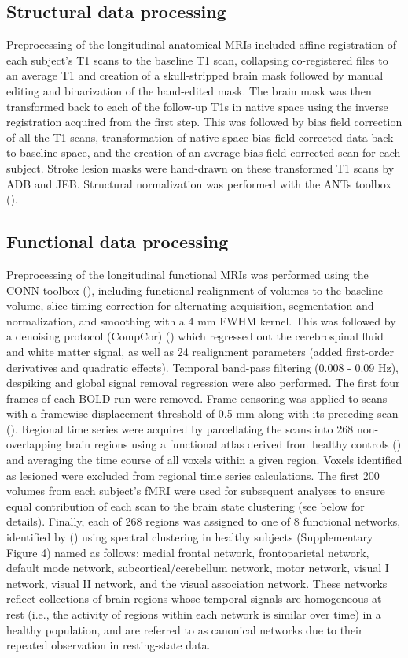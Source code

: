 \documentclass[phd,tocprelim]{cornell}
\begin{document}
	\subsection{Structural data processing}
	Preprocessing of the longitudinal anatomical MRIs included affine registration of each subject’s T1 scans to the baseline T1 scan, collapsing co-registered files to an average T1 and creation of a skull-stripped brain mask followed by manual editing and binarization of the hand-edited mask. The brain mask was then transformed back to each of the follow-up T1s in native space using the inverse registration acquired from the first step. This was followed by bias field correction of all the T1 scans, transformation of native-space bias field-corrected data back to baseline space, and the creation of an average bias field-corrected scan for each subject. Stroke lesion masks were hand-drawn on these transformed T1 scans by ADB and JEB. Structural normalization was performed with the ANTs toolbox (\cite{Avants2011-bl}).
	
	\subsection{Functional data processing}
	Preprocessing of the longitudinal functional MRIs was performed using the CONN toolbox (\cite{Whitfield-Gabrieli2012-ox}), including functional realignment of volumes to the baseline volume, slice timing correction for alternating acquisition, segmentation and normalization, and smoothing with a 4 mm FWHM kernel. This was followed by a denoising protocol (CompCor) (\cite{Behzadi2007-zt}) which regressed out the cerebrospinal fluid and white matter signal, as well as 24 realignment parameters (added first-order derivatives and quadratic effects). Temporal band-pass filtering (0.008 - 0.09 Hz), despiking and global signal removal regression were also performed. The first four frames of each BOLD run were removed. Frame censoring was applied to scans with a framewise displacement threshold of 0.5 mm along with its preceding scan (\cite{Power2012-zm}). Regional time series were acquired by parcellating the scans into 268 non-overlapping brain regions using a functional atlas derived from healthy controls (\cite{Shen2013-zn}) and averaging the time course of all voxels within a given region. Voxels identified as lesioned were excluded from regional time series calculations. The first 200 volumes from each subject's fMRI were used for subsequent analyses to ensure equal contribution of each scan to the brain state clustering (see below for details). Finally, each of 268 regions was assigned to one of 8 functional networks, identified by (\cite{Finn2015-er}) using spectral clustering in healthy subjects (Supplementary Figure 4) named as follows: medial frontal network, frontoparietal network, default mode network, subcortical/cerebellum network, motor network, visual I network, visual II network, and the visual association network. These networks reflect collections of brain regions whose temporal signals are homogeneous at rest (i.e., the activity of regions within each network is similar over time) in a healthy population, and are referred to as canonical networks due to their repeated observation in resting-state data.
	
\end{document}
